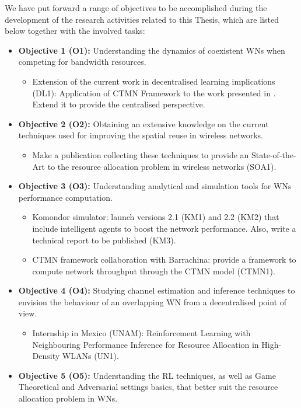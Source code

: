 \documentclass[12pt, a4paper,twoside]{tesi_upf}
\begin{document}
		We have put forward a range of objectives to be accomplished during the development of the research activities related to this Thesis, which are listed below together with the involved tasks:
		\begin{itemize}
			\item \textbf{Objective 1 (O1):} Understanding the dynamics of coexistent WNs when competing for bandwidth resources.
			\begin{itemize}
				\item Extension of the current work in decentralised learning implications (DL1): Application of CTMN Framework to the work presented in \cite{wilhelmi2017implications}. Extend it to provide the centralised perspective.
			\end{itemize}
			\item \textbf{Objective 2 (O2):} Obtaining an extensive knowledge on the current techniques used for improving the spatial reuse in wireless networks.
			\begin{itemize}
				\item Make a publication collecting these techniques to provide an State-of-the-Art to the resource allocation problem in wireless networks (SOA1).
			\end{itemize}
			\item \textbf{Objective 3 (O3):} Understanding analytical and simulation tools for WNs performance computation.
			\begin{itemize}
				\item Komondor simulator: launch versions 2.1 (KM1) and 2.2 (KM2) that include intelligent agents to boost the network performance. Also, write a technical report to be published (KM3).
				\item CTMN framework collaboration with Barrachina: provide a framework to compute network throughput through the CTMN model (CTMN1).
			\end{itemize}
			\item \textbf{Objective 4 (O4):} Studying channel estimation and inference techniques to envision the behaviour of an overlapping WN from a decentralised point of view.
			\begin{itemize}
				\item Internship in Mexico (UNAM): Reinforcement Learning with Neighbouring Performance Inference for Resource Allocation in High-Density WLANs (UN1).
			\end{itemize}		
			\item \textbf{Objective 5 (O5):} Understanding the RL techniques, as well as Game Theoretical and Adversarial settings basics, that better suit the resource allocation problem in WNs. 

\end{itemize}
\end{document}
